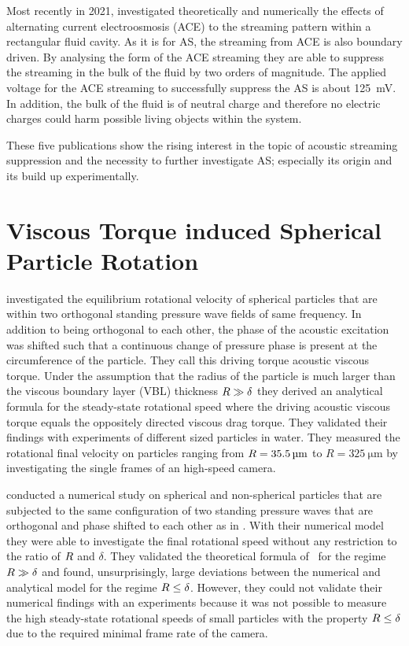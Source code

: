 Most recently in 2021,  investigated theoretically and 
numerically the effects of alternating current electroosmosis (ACE) to the 
streaming pattern within a rectangular fluid cavity. As it is for AS, the 
streaming from ACE is also boundary driven. By analysing the form of the ACE 
streaming they are able to suppress the streaming in the bulk of the fluid by 
two orders of magnitude. The applied voltage for the ACE streaming to 
successfully suppress the AS is about \SI{125}{\milli\volt}. In addition, the 
bulk of the fluid is of neutral charge and therefore no electric charges could 
harm possible living objects within the system.

These five publications show the rising interest in the topic of acoustic 
streaming suppression and the necessity to further investigate AS; especially 
its origin and its build up experimentally.

\section{Viscous Torque induced Spherical Particle Rotation}

 investigated the equilibrium rotational velocity of 
spherical particles that are within two orthogonal standing pressure wave 
fields of same frequency. In addition to being orthogonal to each other, the 
phase of the acoustic excitation was shifted such that a continuous change of 
pressure phase is present at the circumference of the particle. They call this 
driving torque acoustic viscous torque. Under the assumption that the radius of 
the particle is much larger than the viscous boundary layer (VBL) thickness 
$R\gg\delta$ they derived an analytical formula for the steady-state 
rotational speed where the driving acoustic viscous torque equals the 
oppositely directed viscous drag torque. They validated their findings with 
experiments of different sized particles in water. They measured the rotational 
final velocity on particles ranging from $R=\SI{35.5}{\si{\micro\meter}}$ to 
$R=\SI{325}{\um}$ by investigating the single frames of an high-speed camera.

 conducted a numerical study on spherical and non-spherical 
particles that are subjected to the same configuration of two standing pressure 
waves that are orthogonal and phase shifted to each other as in 
. With their numerical model they were able to investigate 
the final rotational speed without any restriction to the ratio of $R$ and 
$\delta$. They validated the theoretical formula of~\cite{Lamprecht2015} for 
the regime $R\gg\delta$ and found, unsurprisingly, large deviations between 
the numerical and analytical model for the regime $R\leq\delta$. However, they 
could not validate their numerical findings with an experiments because it was 
not possible to measure the high steady-state rotational speeds of small 
particles with the property $R\leq\delta$ due to the required minimal frame 
rate of the camera.

